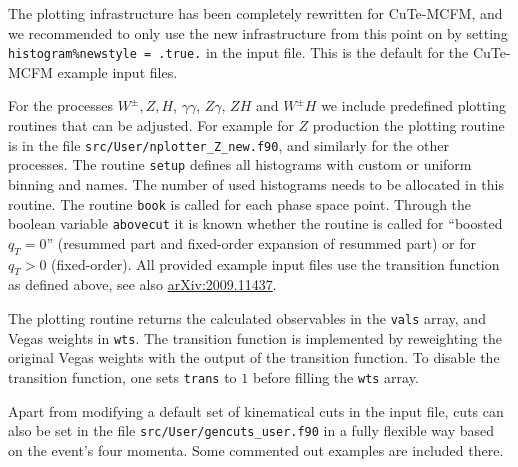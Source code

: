 The plotting infrastructure has been completely rewritten for CuTe-MCFM, and we recommended to only 
use the new infrastructure
from this point on by setting \texttt{histogram\%newstyle = .true.} in
the input file. This is the default for the CuTe-MCFM example input files.

For the processes $W^\pm,Z,H$, $\gamma\gamma$, $Z\gamma$, $ZH$
and $W^\pm H$ we include predefined plotting routines that can be
adjusted. For example for $Z$ production the plotting routine is in the file
\texttt{src/User/nplotter\_Z\_new.f90}, and similarly for the other processes.
The routine \texttt{setup} defines all histograms with custom or uniform
binning and names. The
number of used histograms needs to be allocated in this routine. The
routine \texttt{book} is called for each phase space point. Through the
boolean variable \texttt{abovecut} it is known whether the routine is
called for ``boosted $q_T=0$'' (resummed part and fixed-order expansion of
resummed part) or for $q_T>0$ (fixed-order). All provided example input files
use the transition function as defined above, see also \href{https://arxiv.org/abs/2009.11437}{arXiv:2009.11437}.

The plotting routine returns the calculated observables in the
\texttt{vals} array, and Vegas weights in \texttt{wts}. The transition
function is implemented by reweighting the original Vegas weights with
the output of the transition function. To disable the transition
function, one sets \texttt{trans} to $1$ before filling the \texttt{wts}
array.

Apart from modifying a default set of kinematical cuts in the input
file, cuts can also be set in the file
\texttt{src/User/gencuts\_user.f90} in a fully flexible way based on the
event's four momenta. Some commented out examples are included there.
